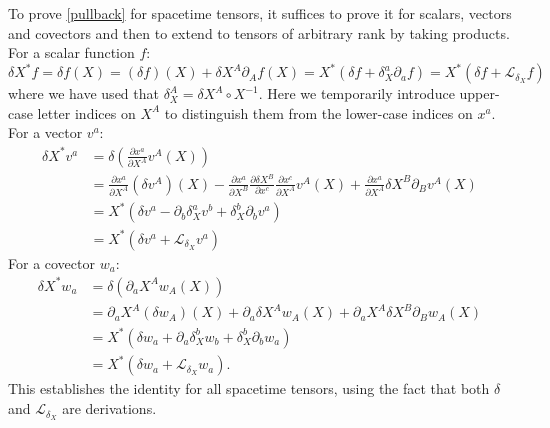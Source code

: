 \documentclass[a4paper,11pt]{article}
\begin{document}
To prove \eqref{pullback} for spacetime tensors, it suffices to prove it for scalars, vectors and covectors and then to extend to tensors of arbitrary rank by taking products.
For a scalar function $f$:
\begin{equation}
\delta X^* f = \delta f(X) = (\delta f)(X) + \delta X^A \partial_A f(X) = X^*( \delta f + \delta_X^a \partial_a f) = X^*( \delta f + \mathcal{L}_{\delta_X} f)
\end{equation}
where we have used that $\delta_X^A = \delta X^A \circ X^{-1}$.
Here we temporarily introduce upper-case letter indices on $X^A$ to distinguish them from the lower-case indices on $x^a$.
For a vector $v^a$:
\begin{align}
\delta X^* v^a &= \delta \left( \frac{\partial x^a}{\partial X^A} v^A(X)  \right) \nonumber \\
&= \frac{\partial x^a}{\partial X^A} (\delta v^A)(X) -\frac{\partial x^a}{\partial X^B} \frac{\partial \delta X^B}{\partial x^c} \frac{\partial x^c}{\partial X^A} v^A(X) +  \frac{\partial x^a}{\partial X^A} \delta X^B \partial_B v^A(X) \nonumber \\
&= X^*( \delta v^a - \partial_b \delta_X^a v^b + \delta_X^b \partial_b v^a) \nonumber \\
&= X^*( \delta v^a + \mathcal{L}_{\delta_X} v^a)
\end{align}
For a covector $w_a$:
\begin{align}
\delta X^* w_a &= \delta (\partial_a X^A w_A(X)) \nonumber \\
&= \partial_a X^A (\delta w_A)(X) + \partial_a \delta X^A w_A(X) + \partial_a X^A \delta X^B \partial_B w_A(X) \nonumber \\
&= X^* ( \delta w_a + \partial_a \delta_X^{b} w_b + \delta_X^b \partial_b w_a)\nonumber \\
&= X^* ( \delta w_a + \mathcal{L}_{\delta_X} w_a).
\end{align}
This establishes the identity for all spacetime tensors, using the fact that both $\delta$ and $\mathcal{L}_{\delta_X}$ are derivations.
\end{document}
